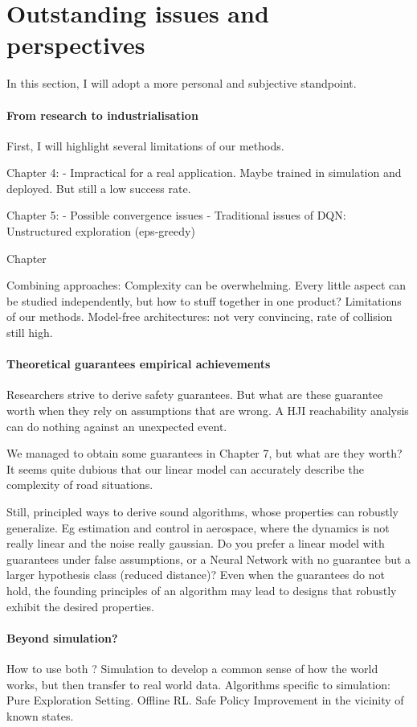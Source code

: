 \section{Outstanding issues and perspectives}
In this section, I will adopt a more personal and subjective standpoint.


\paragraph{From research to industrialisation}

First, I will highlight several limitations of our methods.

Chapter 4:
- Impractical for a real application. Maybe trained in simulation and deployed. But still a low success rate.

Chapter 5:
- Possible convergence issues
- Traditional issues of DQN: Unstructured exploration (eps-greedy)

Chapter 


Combining approaches: Complexity can be overwhelming. Every little aspect can be studied independently, but how to stuff together in one product?
Limitations of our methods. Model-free architectures: not very convincing, rate of collision still high.

\paragraph{Theoretical guarantees \vs empirical achievements}
Researchers strive to derive safety guarantees. 
But what are these guarantee worth when they rely on assumptions that are wrong. 
A HJI reachability analysis can do nothing against an unexpected event.

We managed to obtain some guarantees in Chapter 7, but what are they worth? It seems quite dubious that our linear model can accurately describe the complexity of road situations.

Still, principled ways to derive sound algorithms, whose properties can robustly generalize. Eg estimation and control in aerospace, where the dynamics is not really linear and the noise really gaussian.
Do you prefer a linear model with guarantees under false assumptions, or a Neural Network with no guarantee but a larger hypothesis class (reduced distance)?
Even when the guarantees do not hold, the founding principles of an algorithm may lead to designs that robustly exhibit the desired properties.

\paragraph{Beyond simulation?}
How to use both ?
Simulation to develop a common sense of how the world works, but then transfer to real world data.
Algorithms specific to simulation: Pure Exploration Setting.
Offline RL. Safe Policy Improvement in the vicinity of known states.





